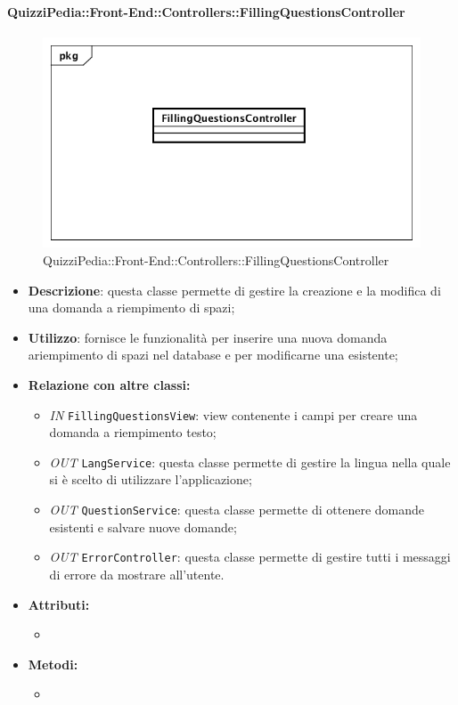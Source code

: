 \paragraph{QuizziPedia::Front-End::Controllers::FillingQuestionsController}
\begin{figure}
	\centering
	\includegraphics[scale=0.45]{UML/Classi/Front-End/QuizziPedia_Front-end_Controller_FillingQuestionsController.png}
	\caption{QuizziPedia::Front-End::Controllers::FillingQuestionsController}
\end{figure}
\begin{itemize}
	\item \textbf{Descrizione}: questa classe permette di gestire la creazione e la modifica di una domanda a riempimento di spazi;
	\item \textbf{Utilizzo}: fornisce le funzionalità per inserire una nuova domanda ariempimento di spazi nel database e per modificarne una esistente;
	\item \textbf{Relazione con altre classi:}
	\begin{itemize}
		\item \textit{IN} \texttt{FillingQuestionsView}: view contenente i campi per creare una domanda a riempimento testo; 
		\item \textit{OUT} \texttt{LangService}: questa classe permette di gestire la lingua nella quale si è scelto di utilizzare l'applicazione;
		\item \textit{OUT} \texttt{QuestionService}: questa classe permette di ottenere domande esistenti e salvare nuove domande;
		\item \textit{OUT} \texttt{ErrorController}: questa classe permette di gestire tutti i messaggi di errore da mostrare all'utente.
	\end{itemize}
	\item \textbf{Attributi:}
	\begin{itemize}
		\item 
	\end{itemize}
	\item \textbf{Metodi:}
	\begin{itemize}
		\item 
	\end{itemize}
\end{itemize}

